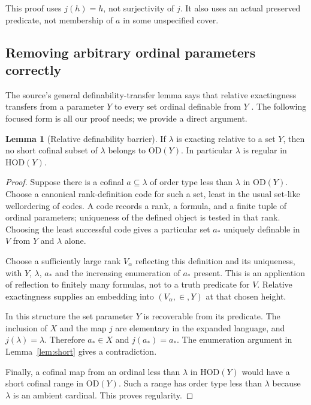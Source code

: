 \documentclass[11pt,letterpaper]{article}
\theoremstyle{definition}
\newtheorem{lemma}[definition]{Lemma}
\newcommand{\HOD}{\mathrm{HOD}}
\newcommand{\OD}{\mathrm{OD}}
\numberwithin{equation}{section}
\begin{document}
This proof uses $j(h)=h$, not surjectivity of $j$. It also uses an actual preserved predicate, not membership of $a$ in some unspecified cover.

\subsection{Removing arbitrary ordinal parameters correctly}

The source's general definability-transfer lemma says that relative exactingness transfers from a parameter $Y$ to every set ordinal definable from $Y$ \cite[Lemma~3.3]{cover}. The following focused form is all our proof needs; we provide a direct argument.

\begin{lemma}[Relative definability barrier]\label{lem:ODY}
If $\lambda$ is exacting relative to a set $Y$, then no short cofinal subset of $\lambda$ belongs to $\OD(Y)$. In particular $\lambda$ is regular in $\HOD(Y)$.
\end{lemma}

\begin{proof}
Suppose there is a cofinal $a\subseteq\lambda$ of order type less than $\lambda$ in $\OD(Y)$. Choose a canonical rank-definition code for such a set, least in the usual set-like wellordering of codes. A code records a rank, a formula, and a finite tuple of ordinal parameters; uniqueness of the defined object is tested in that rank. Choosing the least successful code gives a particular set $a_*$ uniquely definable in $V$ from $Y$ and $\lambda$ alone.

Choose a sufficiently large rank $V_\alpha$ reflecting this definition and its uniqueness, with $Y$, $\lambda$, $a_*$ and the increasing enumeration of $a_*$ present. This is an application of reflection to finitely many formulas, not to a truth predicate for $V$. Relative exactingness supplies an embedding into $(V_\alpha,\in,Y)$ at that chosen height.

In this structure the set parameter $Y$ is recoverable from its predicate. The inclusion of $X$ and the map $j$ are elementary in the expanded language, and $j(\lambda)=\lambda$. Therefore $a_*\in X$ and $j(a_*)=a_*$. The enumeration argument in Lemma~\ref{lem:short} gives a contradiction.

Finally, a cofinal map from an ordinal less than $\lambda$ in $\HOD(Y)$ would have a short cofinal range in $\OD(Y)$. Such a range has order type less than $\lambda$ because $\lambda$ is an ambient cardinal. This proves regularity.
\end{proof}
\end{document}
